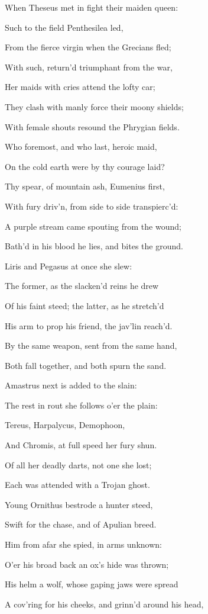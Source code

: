 When Theseus met in fight their maiden queen:

Such to the field Penthesilea led,

From the fierce virgin when the Grecians fled;

With such, return’d triumphant from the war,

Her maids with cries attend the lofty car;

They clash with manly force their moony shields;

With female shouts resound the Phrygian fields.

Who foremost, and who last, heroic maid,

On the cold earth were by thy courage laid?

Thy spear, of mountain ash, Eumenius first,

With fury driv’n, from side to side transpierc’d:

A purple stream came spouting from the wound;

Bath’d in his blood he lies, and bites the ground.

Liris and Pegasus at once she slew:

The former, as the slacken’d reins he drew

Of his faint steed; the latter, as he stretch’d

His arm to prop his friend, the jav’lin reach’d.

By the same weapon, sent from the same hand,

Both fall together, and both spurn the sand.

Amastrus next is added to the slain:

The rest in rout she follows o’er the plain:

Tereus, Harpalycus, Demophoon,

And Chromis, at full speed her fury shun.

Of all her deadly darts, not one she lost;

Each was attended with a Trojan ghost.

Young Ornithus bestrode a hunter steed,

Swift for the chase, and of Apulian breed.

Him from afar she spied, in arms unknown:

O’er his broad back an ox’s hide was thrown;

His helm a wolf, whose gaping jaws were spread

A cov’ring for his cheeks, and grinn’d around his head,


